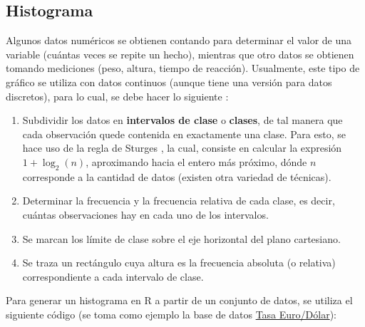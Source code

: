 \documentclass[
  11pt,
]{book}
\providecommand{\tightlist}{%
  \setlength{\itemsep}{0pt}\setlength{\parskip}{0pt}}
\theoremstyle{definition}
\theoremstyle{definition}
\theoremstyle{definition}
\theoremstyle{definition}
\theoremstyle{remark}
\begin{document}
\subsection{Histograma}\label{histograma}

Algunos datos numéricos se obtienen contando para determinar el valor de una variable (cuántas veces se repite un hecho), mientras que otro datos se obtienen tomando mediciones (peso, altura, tiempo de reacción). Usualmente, este tipo de gráfico se utiliza con datos continuos (aunque tiene una versión para datos discretos), para lo cual, se debe hacer lo siguiente \citep[página 12]{Devore}:

\begin{enumerate}
\def\labelenumi{\arabic{enumi}.}
\tightlist
\item
  Subdividir los datos en \textbf{intervalos de clase} o \textbf{clases}, de tal manera que cada observación quede contenida en exactamente una clase. Para esto, se hace uso de la regla de Sturges \citeyearpar{sturges1926choice}, la cual, consiste en calcular la expresión \(1+\log_2(n)\), aproximando hacia el entero más próximo, dónde \(n\) corresponde a la cantidad de datos (existen otra variedad de técnicas).
\item
  Determinar la frecuencia y la frecuencia relativa de cada clase, es decir, cuántas observaciones hay en cada uno de los intervalos.
\item
  Se marcan los límite de clase sobre el eje horizontal del plano cartesiano.
\item
  Se traza un rectángulo cuya altura es la frecuencia absoluta (o relativa) correspondiente a cada intervalo de clase.
\end{enumerate}

Para generar un histograma en R a partir de un conjunto de datos, se utiliza el siguiente código (se toma como ejemplo la base de datos \hyperref[TasaEURUSD]{Tasa Euro/Dólar}):
\end{document}
